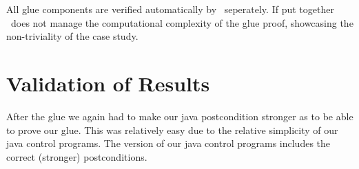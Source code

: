 All glue components are verified automatically by \keym~seperately. If put together \keym~does not manage the computational complexity of the glue proof, showcasing the non-triviality of the case study.

\section{Validation of Results}
\label{sec:traffic:val}

After the glue we again had to make our java postcondition stronger as to be able to prove our glue. This was relatively easy due to the relative simplicity of our java control programs. The version of our java control programs includes the correct (stronger) postconditions.
	